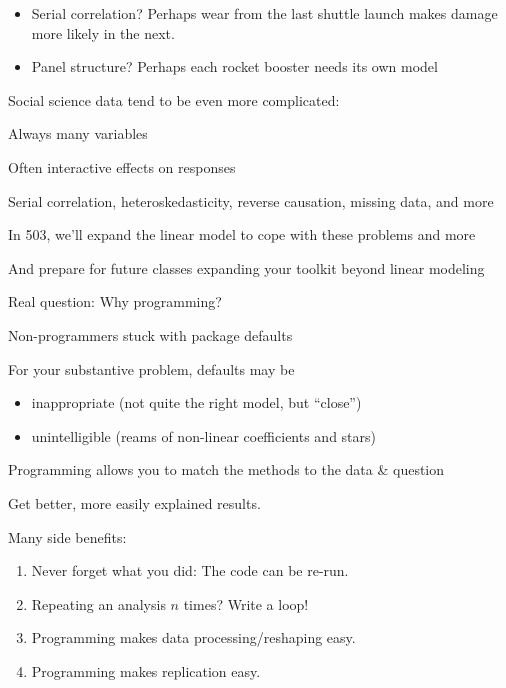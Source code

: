 \documentclass[pdflatex,landscape,titlepage]{foils}
\begin{document}
\begin{itemize}
\item Serial correlation?  Perhaps wear from the last shuttle launch makes damage more likely in the next.

\item Panel structure?  Perhaps each rocket booster needs its own model
\end{itemize}

\bgclear

Social science data tend to be even more complicated:

Always many variables

Often interactive effects on responses

Serial correlation, heteroskedasticity, reverse causation, missing data, and more

In 503, we'll expand the linear model to cope with these problems and more

And prepare for future classes expanding your toolkit beyond linear modeling







\bgclear

Real question:  Why programming?

\vspace{ 1 em}

Non-programmers stuck with package defaults

For your substantive problem, defaults may be 

\begin{itemize}
\item inappropriate (not quite the right model, but ``close'')

\item unintelligible (reams of non-linear coefficients and stars)
\end{itemize}

Programming allows you to match the methods to the data \& question

Get better, more easily explained results.

\bgclear

Many side benefits:

\begin{enumerate}
\item Never forget what you did:  The code can be re-run.

\item Repeating an analysis $n$ times?  Write a loop!

\item Programming makes data processing/reshaping easy.

\item Programming makes replication easy.
\end{enumerate}
\end{document}
